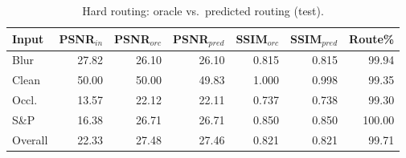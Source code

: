 \begin{table}[t]\centering\caption{Hard routing: oracle vs.\ predicted routing (test).}\label{tab:t2cmp}\setlength{\tabcolsep}{3pt}
\begin{tabular}{lrrrrrr}\toprule
Input & PSNR$_{in}$ & PSNR$_{orc}$ & PSNR$_{pred}$ & SSIM$_{orc}$ & SSIM$_{pred}$ & Route\%\\ \midrule
Blur & 27.82 & 26.10 & 26.10 & 0.815 & 0.815 & 99.94 \\
Clean & 50.00 & 50.00 & 49.83 & 1.000 & 0.998 & 99.35 \\
Occl. & 13.57 & 22.12 & 22.11 & 0.737 & 0.738 & 99.30 \\
S\&P & 16.38 & 26.71 & 26.71 & 0.850 & 0.850 & 100.00 \\
Overall & 22.33 & 27.48 & 27.46 & 0.821 & 0.821 & 99.71 \\
\bottomrule\end{tabular}\end{table}
